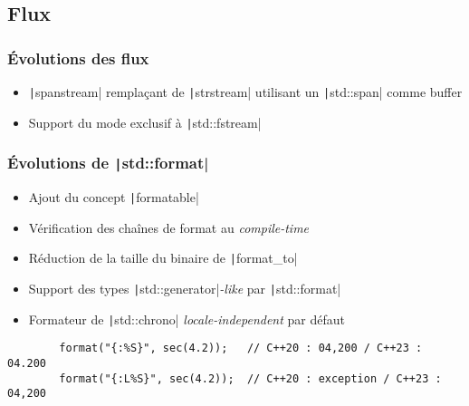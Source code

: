 \documentclass[C++.tex]{subfiles}
\begin{document}
\subsection*{Flux}
\begin{frame}[fragile]
	\frametitle{Évolutions des flux}
	\begin{itemize}
		\item \texttt|spanstream| remplaçant de \texttt|strstream| utilisant un \texttt|std::span| comme buffer


		\item Support du mode exclusif à \texttt|std::fstream|
	\end{itemize}
\end{frame}

\begin{frame}[fragile]
	\frametitle{Évolutions de \texttt|std::format|}
	\begin{itemize}
		\item Ajout du concept \texttt|formatable|
		\item Vérification des chaînes de format au \textit{compile-time}
		\item Réduction de la taille du binaire de \texttt|format_to|
		\item Support des types \texttt|std::generator|\textit{-like} par \texttt|std::format|
		\item Formateur de \texttt|std::chrono| \textit{locale-independent} par défaut

	\end{itemize}

	\begin{verbatim}
		format("{:%S}", sec(4.2));   // C++20 : 04,200 / C++23 : 04.200
		format("{:L%S}", sec(4.2));  // C++20 : exception / C++23 : 04,200
	\end{verbatim}
\end{frame}
\end{document}
